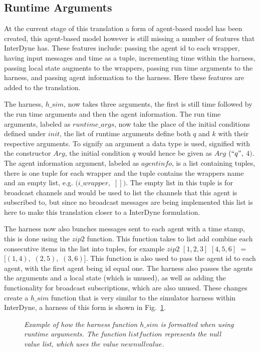 \documentclass{article}
\begin{document}
\subsection{Runtime Arguments}
At the current stage of this translation a form of agent-based model has been created, this agent-based model however is still missing a number of features that InterDyne has. These features include: passing the agent id to each wrapper, having input messages and time as a tuple, incrementing time within the harness, passing local state augments to the wrappers, passing run time arguments to the harness, and passing agent information to the harness. Here these features are added to the translation. 

The harness, $h\_sim$, now takes three arguments, the first is still time followed by the run time arguments and then the agent information. The run time arguments, labeled as $runtime\_args$, now take the place of the initial conditions defined under $init$, the list of runtime arguments define both $q$ and $k$ with their respective arguments. To signify an argument a data type is used, signified with the constructor $Arg$, the initial condition $q$ would hence be given as $Arg$ $(``q",$ $4)$. The agent information argument, labeled as $agentinfo$, is a list containing tuples, there is one tuple for each wrapper and the tuple contains the wrappers name and an empty list, e.g. $(i\_wrapper,$ $[])$. The empty list in this tuple is for broadcast channels and would be used to list the channels that this agent is subscribed to, but since no broadcast messages are being implemented this list is here to make this translation closer to a InterDyne formulation.

The harness now also bunches messages sent to each agent with a time stamp, this is done using the $zip2$ function. This function takes to list add combine each consecutive items in the list into tuples, for example $zip2$ $[1,2,3]$ $[4,5,6]$ $=$ $[(1,4),$ $(2,5),$ $(3,6)]$. This function is also used to pass the agent id to each agent, with the first agent being id equal one. The harness also passes the agents the arguments and a local state (which is unused), as well as adding the functionality for broadcast subscriptions, which are also unused. These changes create a $h\_sim$ function that is very similar to the simulator harness within InterDyne, a harness of this form is shown in Fig.~\ref{fig:harn7}.  
\begin{figure}[H]
	\centering
	
	\caption{\it Example of how the harness function $h\_sim$ is formatted when using runtime arguments. The function $listfuction$ represents the null value list, which uses the value $newnullvalue$.}
	\label{fig:harn7}
\end{figure} 
\end{document}
